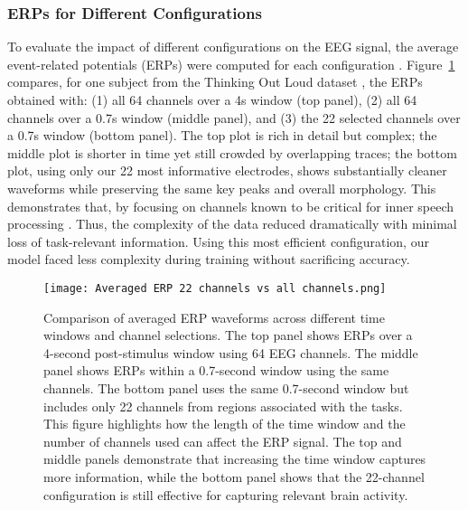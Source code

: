 \documentclass[pdflatex,sn-mathphys-num]{sn-jnl}%
\theoremstyle{thmstyleone}%
\theoremstyle{thmstyletwo}%
\theoremstyle{thmstylethree}%
\begin{document}
\subsubsection{ERPs for Different Configurations}\label{subsec9}



To evaluate the impact of different configurations on the EEG signal, the average event-related potentials (ERPs) were computed for each configuration \cite{Picton2000,Luck2014}. Figure~\ref{fig:Averaged ERP 22 channels vs all channels} compares, for one subject from the Thinking Out Loud dataset \cite{nieto2022thinking}, the ERPs obtained with: (1) all 64 channels over a 4s window (top panel), (2) all 64 channels over a 0.7s window (middle panel), and (3) the 22 selected channels over a 0.7s window (bottom panel). The top plot is rich in detail but complex; the middle plot is shorter in time yet still crowded by overlapping traces; the bottom plot, using only our 22 most informative electrodes, shows substantially cleaner waveforms while preserving the same key peaks and overall morphology. This demonstrates that, by focusing on channels known to be critical for inner speech processing \cite{PerroneBertolotti2014}. Thus, the complexity of the data reduced dramatically with minimal loss of task-relevant information. Using this most efficient configuration, our model faced less complexity during training without sacrificing accuracy.

\begin{figure}[H]
    \centering
    \texttt{[image: Averaged ERP 22 channels vs all channels.png]}
    \caption{Comparison of averaged ERP waveforms across different time windows and channel selections. The top panel shows ERPs over a 4-second post-stimulus window using 64 EEG channels. The middle panel shows ERPs within a 0.7-second window using the same channels. The bottom panel uses the same 0.7-second window but includes only 22 channels from regions associated with the tasks. This figure highlights how the length of the time window and the number of channels used can affect the ERP signal. The top and middle panels demonstrate that increasing the time window captures more information, while the bottom panel shows that the 22-channel configuration is still effective for capturing relevant brain activity.}
    \label{fig:Averaged ERP 22 channels vs all channels}
\end{figure}
\end{document}
